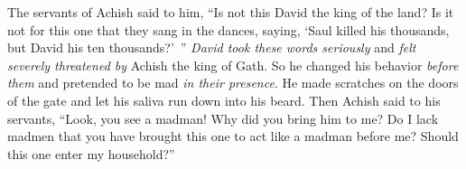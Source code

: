 \begin{biblechapter}
\verse The servants of Achish said to him, “Is not this David the king of the land? Is it not for this one that they sang in the dances, saying, ‘Saul killed his thousands, but David his ten thousands?’ ”
\verse \textit{David took these words seriously} and \textit{felt severely threatened by} Achish the king of Gath.
\verse So he changed his behavior \textit{before them} and pretended to be mad \textit{in their presence}. He made scratches on the doors of the gate and let his saliva run down into his beard.
\verse Then Achish said to his servants, “Look, you see a madman! Why did you bring him to me?
\verse Do I lack madmen that you have brought this one to act like a madman before me? Should this one enter my household?”
\end{biblechapter}

